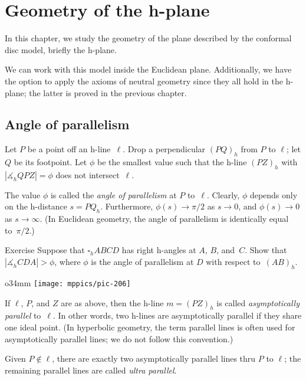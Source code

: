 \chapter{Geometry of the h-plane}\label{chap:h-plane}

In this chapter, we study the geometry of the plane described by the conformal disc model, briefly the h-plane.

We can work with this model inside the Euclidean plane. 
Additionally, we have the option to apply the axioms of neutral geometry since they all hold in the h-plane; the latter is proved in the previous chapter.

\section{Angle of parallelism}

Let $P$ be a point off an h-line~$\ell$. 
Drop a perpendicular $(PQ)_h$ from $P$ to $\ell$;
let $Q$ be its footpoint.
Let $\phi$ be the smallest value such that the h-line $(PZ)_h$ with $|\measuredangle_h Q P Z|=\phi$ does not intersect~$\ell$.

The value $\phi$ is called the \emph{angle of parallelism} at $P$ to~$\ell$.
Clearly, $\phi$ depends only on the h-distance $s=PQ_h$.
Furthermore, $\phi(s)\to \pi/2$ as $s\to 0$, 
and $\phi(s)\to0$ as $s\to\infty$.
(In Euclidean geometry, the angle of parallelism is identically equal to~$\pi/2$.)

\begin{thm}{Exercise}\label{ex:lambert-parallelism}
Suppose that $\square_hABCD$ has right h-angles at $A$, $B$, and~$C$.
Show that $|\measuredangle_h CDA|>\phi$, where $\phi$ is the angle of parallelism at $D$ with respect to~$(AB)_h$.
\end{thm}

\begin{wrapfigure}{o}{34mm}
\vskip-3mm
\centering
\texttt{[image: mppics/pic-206]}
\end{wrapfigure}

If $\ell$, $P$, and $Z$ are as above, then the h-line $m=(PZ)_h$ is called \emph{asymptotically parallel} to~$\ell$.
In other words, two h-lines are asymptotically parallel if they share one ideal point.
(In hyperbolic geometry, the term parallel lines is often used for asymptotically parallel lines; we do not follow this convention.)

Given $P\not\in\ell$, there are exactly two asymptotically parallel lines thru $P$ to $\ell$; 
the remaining parallel lines are called \emph{ultra parallel}.


